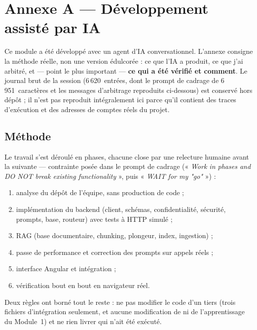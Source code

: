 \section{Annexe A --- Développement assisté par IA}
\label{sec:dev-ia}

Ce module a été développé avec un agent d'IA conversationnel. L'annexe consigne
la méthode réelle, non une version édulcorée : ce que l'IA a produit, ce que
j'ai arbitré, et --- point le plus important --- \textbf{ce qui a été vérifié
et comment}. Le journal brut de la session (6\,620~entrées, dont le prompt de
cadrage de 6\,951~caractères et les messages d'arbitrage reproduits ci-dessous)
est conservé hors dépôt ; il n'est pas reproduit intégralement ici parce qu'il
contient des traces d'exécution et des adresses de comptes réels du projet.

\subsection{Méthode}

Le travail s'est déroulé en phases, chacune close par une relecture humaine
avant la suivante --- contrainte posée dans le prompt de cadrage (« \emph{Work in
phases and DO NOT break existing functionality} », puis « \emph{WAIT for my
"go"} ») :

\begin{enumerate}[label=\textbf{phase \arabic*.},leftmargin=4em,itemsep=2pt]
  \item analyse du dépôt de l'équipe, sans production de code ;
  \item implémentation du backend (client, schémas, confidentialité, sécurité,
        prompts, base, routeur) avec tests à HTTP simulé ;
  \item RAG (base documentaire, chunking, plongeur, index, ingestion) ;
  \item passe de performance et correction des prompts sur appels réels ;
  \item interface Angular et intégration ;
  \item vérification bout en bout en navigateur réel.
\end{enumerate}

Deux règles ont borné tout le reste : ne pas modifier le code d'un tiers (trois
fichiers d'intégration seulement, et aucune modification de  ni de
l'apprentissage du Module~1) et ne rien livrer qui n'ait été exécuté.

